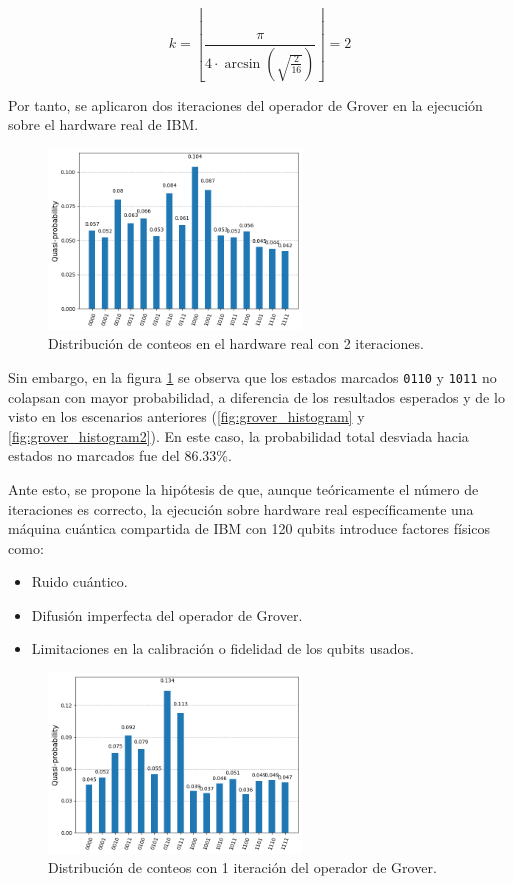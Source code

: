 \documentclass{article}
\begin{document}
\[
k = \left\lfloor \frac{\pi}{4 \cdot \arcsin\left(\sqrt{\frac{2}{16}}\right)} 
\right\rfloor = 2
\]

Por tanto, se aplicaron dos iteraciones del operador de Grover en la ejecución 
sobre el hardware real de IBM.

\begin{figure}[H]
    \centering
    \includegraphics[width=0.6\textwidth]{hist3.png}
    \caption{Distribución de conteos en el hardware real con 2 iteraciones.}
    \label{fig:grover_histogram3}
\end{figure}

Sin embargo, en la figura \ref{fig:grover_histogram3} se observa que los estados 
marcados \texttt{0110} y \texttt{1011} no colapsan con mayor probabilidad, a 
diferencia de los resultados esperados y de lo visto en los escenarios 
anteriores (\ref{fig:grover_histogram} y \ref{fig:grover_histogram2}). 
En este caso, la probabilidad total desviada hacia estados no marcados fue del 86.33\%.

Ante esto, se propone la hipótesis de que, aunque teóricamente el número 
de iteraciones es correcto, la ejecución sobre hardware real específicamente 
una máquina cuántica compartida de IBM con 120 qubits introduce factores físicos como:

\begin{itemize}
    \item Ruido cuántico.
    \item Difusión imperfecta del operador de Grover.
    \item Limitaciones en la calibración o fidelidad de los qubits usados.
\end{itemize}

\begin{figure}[H]
    \centering
    \includegraphics[width=0.6\textwidth]{hist3_a.png}
    \caption{Distribución de conteos con 1 iteración del operador de Grover.}
    \label{fig:grover_histogram3a}
\end{figure}
\end{document}
